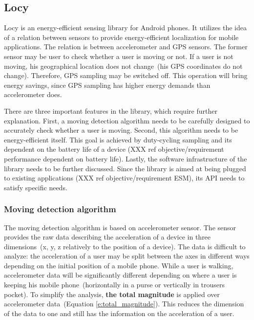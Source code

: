 \subsection{Locy}
\label{s:design:locy}
\hspace{10pt}Locy is an energy-efficient sensing library for Android phones. It utilizes the idea of a relation between sensors to provide energy-efficient localization for mobile applications. The relation is between accelerometer and GPS sensors. The former sensor may be user to check whether a user is moving or not. If a user is not moving, his geographical location does not change\ (his GPS coordinates do not change). Therefore, GPS sampling may be switched off. This operation will bring energy savings, since GPS sampling has higher energy demands than accelerometer does. 

There are three important features in the library, which require further explanation. First, a moving detection algorithm needs to be carefully designed to accurately check whether a user is moving. Second, this algorithm needs to be energy-efficient itself. This goal is achieved by duty-cycling sampling and its dependent on the battery life of a device (XXX ref objective/requirement performance dependent on battery life). Lastly, the software infrastructure of the library needs to be further discussed. Since the library is aimed at being plugged to existing applications (XXX ref objective/requirement ESM), its API needs to satisfy specific needs. 

\subsubsection{Moving detection algorithm}
\label{s:design:locy:moving}
\hspace{10pt}The moving detection algorithm is based on accelerometer sensor. The sensor provides the raw data describing the acceleration of a device in three dimensions\ (x, y, z relatively to the position of a device).  The data is difficult to analyze: the acceleration of a user may be split between the axes in different ways depending on the initial position of a mobile phone. While a user is walking, accelerometer data will be significantly different depending on where a user is keeping his mobile phone\ (horizontally in a purse or vertically in trousers pocket). To simplify the analysis, \textbf{the total magnitude} is applied over accelerometer data\ (Equation \ref{e:total_magnitude}). This reduces the dimension of the data to one and still has the information on the acceleration of a user. 

